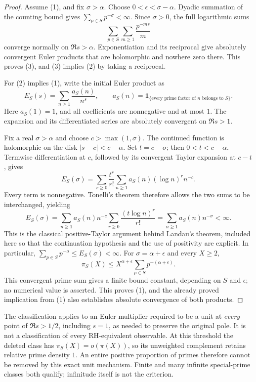 \documentclass[11pt]{article}
\theoremstyle{definition}
\begin{document}
\begin{proof}
Assume (1), and fix $\sigma>\alpha$.
Choose $0<\epsilon<\sigma-\alpha$.
Dyadic summation of the counting bound gives
$\sum_{p\in S}p^{-\sigma}<\infty$.
Since $\sigma>0$, the full logarithmic sums
\[
 \sum_{p\in S}\sum_{m\ge1}\frac{p^{-ms}}m
\]
converge normally on $\Re s>\alpha$.
Exponentiation and its reciprocal give absolutely convergent
Euler products that are holomorphic and nowhere zero there.
This proves (3), and (3) implies (2) by taking a reciprocal.

For (2) implies (1), write the initial Euler product as
\[
 E_S(s)=\sum_{n\ge1}\frac{a_S(n)}{n^s},\qquad
 a_S(n)=\mathbf1_{\{\text{every prime factor of }n
                            \text{ belongs to }S\}}.
\]
Here $a_S(1)=1$, and all coefficients are nonnegative and
at most $1$. The expansion and its differentiated series
are absolutely convergent on $\Re s>1$.

Fix a real $\sigma>\alpha$ and choose
$c>\max(1,\sigma)$.
The continued function is holomorphic on the disk
$|s-c|<c-\alpha$. Set $t=c-\sigma$; then
$0<t<c-\alpha$.
Termwise differentiation at $c$, followed by its convergent
Taylor expansion at $c-t$, gives
\[
 E_S(\sigma)
 =\sum_{r\ge0}\frac{t^r}{r!}
       \sum_{n\ge1}a_S(n)(\log n)^r n^{-c}.
\]
Every term is nonnegative. Tonelli's theorem therefore
allows the two sums to be interchanged, yielding
\[
 E_S(\sigma)
 =\sum_{n\ge1}a_S(n)n^{-c}
       \sum_{r\ge0}\frac{(t\log n)^r}{r!}
 =\sum_{n\ge1}a_S(n)n^{-\sigma}<\infty.
\]
This is the classical positive-Taylor argument behind
Landau's theorem, included here so that the continuation
hypothesis and the use of positivity are explicit.
In particular,
$\sum_{p\in S}p^{-\sigma}\le E_S(\sigma)<\infty$.
For $\sigma=\alpha+\epsilon$ and every $X\ge2$,
\[
 \pi_S(X)\le
 X^{\alpha+\epsilon}
       \sum_{p\in S}p^{-(\alpha+\epsilon)}.
\]
This convergent prime sum gives a finite bound constant,
depending on $S$ and $\epsilon$; no numerical value is asserted.
This proves (1), and the already proved implication from
(1) also establishes absolute convergence of both products.
\end{proof}

The classification applies to an Euler multiplier required
to be a unit at \emph{every} point of $\Re s>1/2$,
including $s=1$, as needed to preserve the original pole.
It is not a classification of every RH-equivalent observable.
At this threshold the deleted class has
$\pi_S(X)=o(\pi(X))$, so its unweighted complement retains
relative prime density $1$.
An entire positive proportion of primes therefore cannot
be removed by this exact unit mechanism.
Finite and many infinite special-prime classes both qualify;
infinitude itself is not the criterion.
\end{document}
